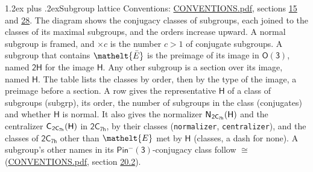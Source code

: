 \documentclass[10pt,a4paper]{article}
\makeatletter
\renewcommand\section{\@startsection{section}{1}{\z@}{-3ex plus -1ex minus -.2ex}%
  {1.2ex plus .2ex}{\normalfont\large\sffamily\bfseries\color{parttitle}}}
\numberwithin{equation}{section}
\newcommand{\eltfont}[1]{{\let\sigma\eltsigma\mathelt{#1}}}
\newcommand{\grp}[1]{\mathsf{#1}}
\newcommand{\cls}[1]{\eltfont{#1}}
\newcommand{\elt}[1]{\eltfont{#1}}
\newcommand{\samecls}{\cong}
\newcommand{\barred}[1]{\bar{#1}}
\newcommand{\hairsp}{\mkern1mu}
\makeatother
\begin{document}
\section{Subgroup lattice}\label{s:subgroups}
Conventions: \href{../../CONVENTIONS.pdf}{CONVENTIONS.pdf}, sections \href{../../../rotation/CONVENTIONS.pdf\#conv.15}{15} and \href{../../CONVENTIONS.pdf\#conv.28}{28}.
The diagram shows the conjugacy classes of subgroups, each joined to the classes of its maximal subgroups, and the orders increase upward. \label{n:index.conjugates.c}A normal subgroup is framed, and ${\times}c$ is the number $c > 1$ of conjugate subgroups. \label{n:group.H}A subgroup that contains $\elt{\barred{E}}$ is the preimage of its image in $\grp{O(3)}$, named $\grp{2H}$ for the image $\grp{H}$. Any other subgroup is a section over its image, named $\grp{H}$. The table lists the classes by order, then by the type of the image, a preimage before a section. \label{n:head.subgroup}\label{n:head.order}\label{n:head.conjugates}\label{n:head.normal}A row gives the representative $\grp{H}$ of a class of subgroups (subgrp), its order, the number of subgroups in the class (conjugates) and whether $\grp{H}$ is normal. \label{n:group.normalizer}\label{n:group.centralizer}\label{n:head.classes}It also gives the normalizer $\grp{N}_{\hairsp \grp{2C_{7h}}}(\grp{H})$ and the centralizer $\grp{C}_{\hairsp \grp{2C_{7h}}}(\grp{H})$ in $\grp{2C_{7h}}$, by their classes (\texttt{normalizer}, \texttt{centralizer}), and the classes of $\grp{2C_{7h}}$ other than $\cls{E}$ met by $\grp{H}$ (classes, a dash for none). A subgroup's other names in its \href{Pinminus3.pdf}{$\grp{Pin^{-}(3)}$}-conjugacy class follow $\samecls$ (\href{../../CONVENTIONS.pdf}{CONVENTIONS.pdf}, section \href{../../CONVENTIONS.pdf\#conv.20.2}{20.2}).
\begin{center}
\end{center}
\end{document}
